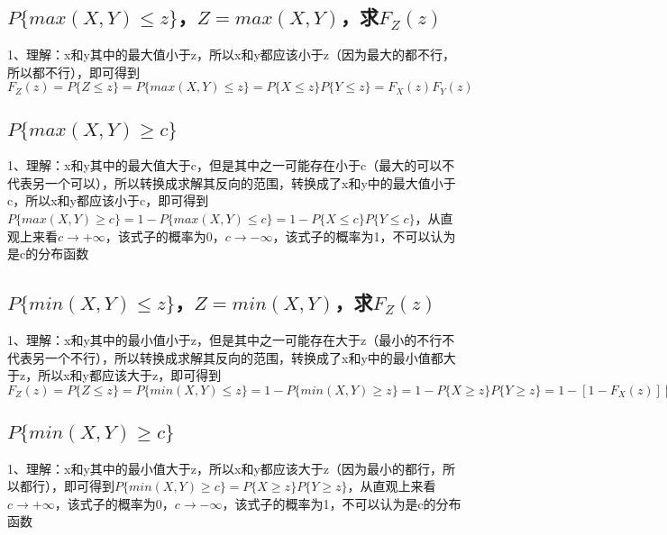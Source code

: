 \subsection{$ P\{max(X,Y)\le z\} $，$ Z=max(X,Y) $，求$ F_Z(z) $}

1、理解：x和y其中的最大值小于z，所以x和y都应该小于z（因为最大的都不行，所以都不行），即可得到$ F_{Z}(z)=P\{Z\le z\}=P\{max(X,Y)\le z\}=P\{X \le z\}P\{Y \le z\}=F_X(z)F_Y(z) $



\subsection{$ P\{max(X,Y)\ge c\} $}

1、理解：x和y其中的最大值大于c，但是其中之一可能存在小于c（最大的可以不代表另一个可以），所以转换成求解其反向的范围，转换成了x和y中的最大值小于c，所以x和y都应该小于c，即可得到$ P\{max(X,Y)\ge c\}=1-P\{max(X,Y)\le c\}=1-P\{X \le c\}P\{Y \le c\} $，从直观上来看$ c \rightarrow +\infty $，该式子的概率为0，$ c \rightarrow -\infty $，该式子的概率为1，不可以认为是c的分布函数



\subsection{$ P\{min(X,Y)\le z\} $，$ Z=min(X,Y) $，求$ F_Z(z) $}

1、理解：x和y其中的最小值小于z，但是其中之一可能存在大于z（最小的不行不代表另一个不行），所以转换成求解其反向的范围，转换成了x和y中的最小值都大于z，所以x和y都应该大于z，即可得到$ F_{Z}(z)=P\{Z\le z\}=P\{min(X,Y)\le z\}=1-P\{min(X,Y)\ge z\}=1-P\{X \ge z\}P\{Y \ge z\}=1-[1-F_X(z)][1-F_Y(z)] $



\subsection{$ P\{min(X,Y)\ge c\} $}

1、理解：x和y其中的最小值大于z，所以x和y都应该大于z（因为最小的都行，所以都行），即可得到$ P\{min(X,Y)\ge c\}=P\{X \ge z\}P\{Y \ge z\} $，从直观上来看$ c \rightarrow +\infty $，该式子的概率为0，$ c \rightarrow -\infty $，该式子的概率为1，不可以认为是c的分布函数

